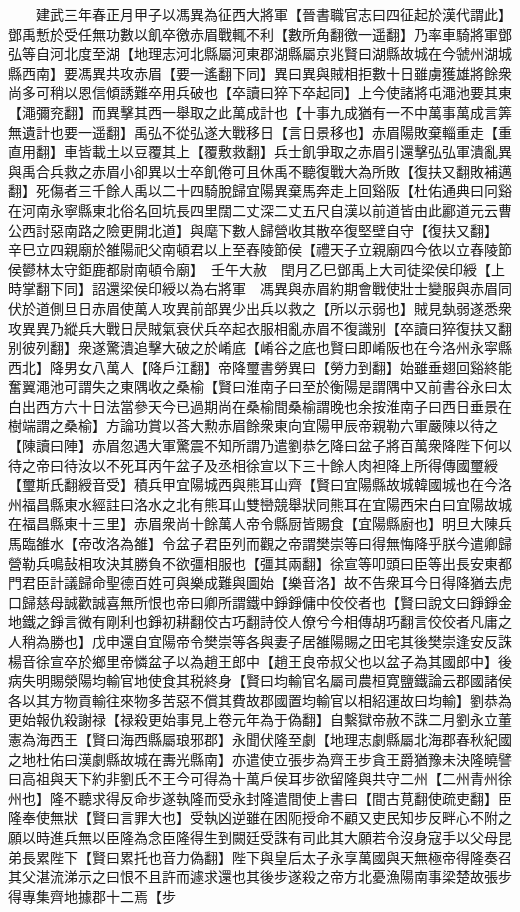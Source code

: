 　　建武三年春正月甲子以馮異為征西大將軍【晉書職官志曰四征起於漢代謂此】鄧禹慙於受任無功數以飢卒徼赤眉戰輒不利【數所角翻徼一遥翻】乃率車騎將軍鄧弘等自河北度至湖【地理志河北縣屬河東郡湖縣屬京兆賢曰湖縣故城在今虢州湖城縣西南】要馮異共攻赤眉【要一遙翻下同】異曰異與賊相拒數十日雖虜獲雄將餘衆尚多可稍以恩信傾誘難卒用兵破也【卒讀曰猝下卒起同】上今使諸將屯澠池要其東【澠彌兖翻】而異擊其西一舉取之此萬成計也【十事九成猶有一不中萬事萬成言筭無遺計也要一遥翻】禹弘不從弘遂大戰移日【言日景移也】赤眉陽敗棄輜重走【重直用翻】車皆載土以豆覆其上【覆敷救翻】兵士飢爭取之赤眉引還擊弘弘軍潰亂異與禹合兵救之赤眉小卻異以士卒飢倦可且休禹不聽復戰大為所敗【復扶又翻敗補邁翻】死傷者三千餘人禹以二十四騎脫歸宜陽異棄馬奔走上回谿阪【杜佑通典曰冋谿在河南永寧縣東北俗名回坑長四里闊二丈深二丈五尺自漢以前道皆由此酈道元云曹公西討惡南路之險更開北道】與麾下數人歸營收其散卒復堅壁自守【復扶又翻】　辛巳立四親廟於雒陽祀父南頓君以上至舂陵節侯【禮天子立親廟四今依以立舂陵節侯鬰林太守鉅鹿都尉南頓令廟】　壬午大赦　閏月乙巳鄧禹上大司徒梁侯印綬【上時掌翻下同】詔還梁侯印綬以為右將軍　馮異與赤眉約期會戰使壯士變服與赤眉同伏於道側旦日赤眉使萬人攻異前部異少出兵以救之【所以示弱也】賊見埶弱遂悉衆攻異異乃縱兵大戰日昃賊氣衰伏兵卒起衣服相亂赤眉不復識别【卒讀曰猝復扶又翻别彼列翻】衆遂驚潰追擊大破之於崤底【崤谷之底也賢曰即崤阪也在今洛州永寜縣西北】降男女八萬人【降戶江翻】帝降璽書勞異曰【勞力到翻】始雖垂翅回谿終能奮翼澠池可謂失之東隅收之桑榆【賢曰淮南子曰至於衡陽是謂隅中又前書谷永曰太白出西方六十日法當參天今已過期尚在桑榆間桑榆謂晚也余按淮南子曰西日垂景在樹端謂之桑榆】方論功賞以荅大勲赤眉餘衆東向宜陽甲辰帝親勒六軍嚴陳以待之【陳讀曰陣】赤眉忽遇大軍驚震不知所謂乃遣劉恭乞降曰盆子將百萬衆降陛下何以待之帝曰待汝以不死耳丙午盆子及丞相徐宣以下三十餘人肉袒降上所得傳國璽綬【璽斯氏翻綬音受】積兵甲宜陽城西與熊耳山齊【賢曰宜陽縣故城韓國城也在今洛州福昌縣東水經註曰洛水之北有熊耳山雙巒競舉狀同熊耳在宜陽西宋白曰宜陽故城在福昌縣東十三里】赤眉衆尚十餘萬人帝令縣厨皆賜食【宜陽縣廚也】明旦大陳兵馬臨雒水【帝改洛為雒】令盆子君臣列而觀之帝謂樊崇等曰得無悔降乎朕今遣卿歸營勒兵鳴鼔相攻決其勝負不欲彊相服也【彊其兩翻】徐宣等叩頭曰臣等出長安東都門君臣計議歸命聖德百姓可與樂成難與圖始【樂音洛】故不告衆耳今日得降猶去虎口歸慈母誠歡誠喜無所恨也帝曰卿所謂鐵中錚錚傭中佼佼者也【賢曰說文曰錚錚金地鐵之錚言微有剛利也錚初耕翻佼古巧翻詩佼人僚兮今相傳胡巧翻言佼佼者凡庸之人稍為勝也】戊申還自宜陽帝令樊崇等各與妻子居雒陽賜之田宅其後樊崇逢安反誅楊音徐宣卒於鄉里帝憐盆子以為趙王郎中【趙王良帝叔父也以盆子為其國郎中】後病失明賜滎陽均輸官地使食其税終身【賢曰均輸官名屬司農桓寛鹽鐵論云郡國諸侯各以其方物貢輸往來物多苦惡不償其費故郡國置均輸官以相紹運故曰均輸】劉恭為更始報仇殺謝禄【禄殺更始事見上卷元年為于偽翻】自繫獄帝赦不誅二月劉永立董憲為海西王【賢曰海西縣屬琅邪郡】永聞伏隆至劇【地理志劇縣屬北海郡春秋紀國之地杜佑曰漢劇縣故城在夀光縣南】亦遣使立張步為齊王步貪王爵猶豫未決隆曉譬曰高祖與天下約非劉氏不王今可得為十萬戶侯耳步欲留隆與共守二州【二州青州徐州也】隆不聽求得反命步遂執隆而受永封隆遣間使上書曰【間古莧翻使疏吏翻】臣隆奉使無狀【賢曰言罪大也】受執凶逆雖在困阨授命不顧又吏民知步反畔心不附之願以時進兵無以臣隆為念臣隆得生到闕廷受誅有司此其大願若令沒身寇手以父母昆弟長累陛下【賢曰累托也音力偽翻】陛下與皇后太子永享萬國與天無極帝得隆奏召其父湛流涕示之曰恨不且許而遽求還也其後步遂殺之帝方北憂漁陽南事梁楚故張步得專集齊地據郡十二焉【步
